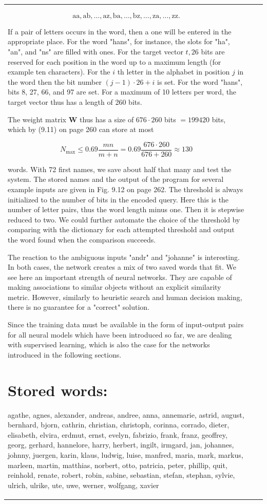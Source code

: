 \documentclass[10pt]{book}
\begin{document}
\begin{center}
\begin{tabular}{|l|l|l|}
$$
\mathrm{aa}, \mathrm{ab}, \ldots, \mathrm{az}, \mathrm{ba}, \ldots, \mathrm{bz}, \ldots, \mathrm{za}, \ldots, \mathrm{zz} .
$$

If a pair of letters occurs in the word, then a one will be entered in the appropriate place. For the word "hans", for instance, the slots for "ha", "an", and "ns" are filled with ones. For the target vector $t, 26$ bits are reserved for each position in the word up to a maximum length (for example ten characters). For the $i$ th letter in the alphabet in position $j$ in the word then the bit number $(j-1) \cdot 26+i$ is set. For the word "hans", bits 8, 27, 66, and 97 are set. For a maximum of 10 letters per word, the target vector thus has a length of 260 bits.

The weight matrix $\boldsymbol{W}$ thus has a size of $676 \cdot 260$ bits $=199420$ bits, which by (9.11) on page 260 can store at most

$$
N_{\max } \leq 0.69 \frac{m n}{m+n}=0.69 \frac{676 \cdot 260}{676+260} \approx 130
$$

words. With 72 first names, we save about half that many and test the system. The stored names and the output of the program for several example inputs are given in Fig. 9.12 on page 262. The threshold is always initialized to the number of bits in the encoded query. Here this is the number of letter pairs, thus the word length minus one. Then it is stepwise reduced to two. We could further automate the choice of the threshold by comparing with the dictionary for each attempted threshold and output the word found when the comparison succeeds.

The reaction to the ambiguous inputs "andr" and "johanne" is interesting. In both cases, the network creates a mix of two saved words that fit. We see here an important strength of neural networks. They are capable of making associations to similar objects without an explicit similarity metric. However, similarly to heuristic search and human decision making, there is no guarantee for a "correct" solution.

Since the training data must be available in the form of input-output pairs for all neural models which have been introduced so far, we are dealing with supervised learning, which is also the case for the networks introduced in the following sections.

\section{Stored words:}
agathe, agnes, alexander, andreas, andree, anna, annemarie, astrid, august, bernhard, bjorn, cathrin, christian, christoph, corinna, corrado, dieter, elisabeth, elvira, erdmut, ernst, evelyn, fabrizio, frank, franz, geoffrey, georg, gerhard, hannelore, harry, herbert, ingilt, irmgard, jan, johannes, johnny, juergen, karin, klaus, ludwig, luise, manfred, maria, mark, markus, marleen, martin, matthias, norbert, otto, patricia, peter, phillip, quit, reinhold, renate, robert, robin, sabine, sebastian, stefan, stephan, sylvie, ulrich, ulrike, ute, uwe, werner, wolfgang, xavier

\end{tabular}
\end{center}
\end{document}
